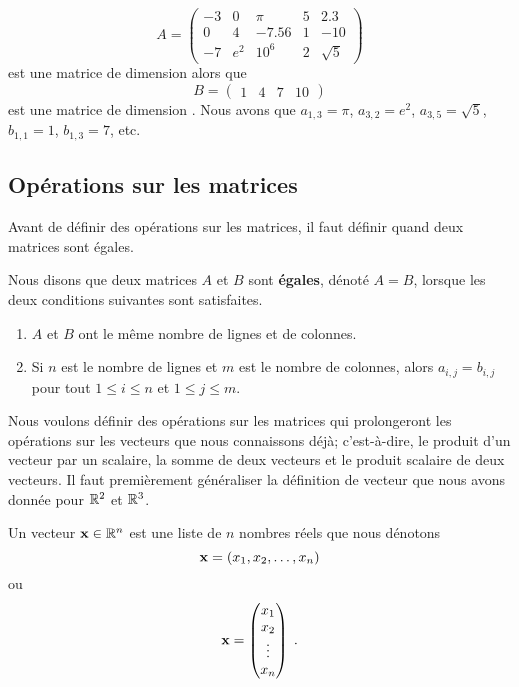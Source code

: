 {\begin{egg}
\[
A =
\begin{pmatrix}
-3 & 0 & \pi & 5 & 2.3 \\
0 & 4 & -7.56 & 1 & -10 \\
-7 & e^2 & 10^6 & 2 & \sqrt{5}
\end{pmatrix}
\]
est une matrice de dimension  alors que
\[
B =
\begin{pmatrix}
1 & 4 & 7 & 10
\end{pmatrix}
\]
est une matrice de dimension .  Nous avons que $a_{1,3} = \pi$,
$a_{3,2} = e^2$, $a_{3,5} = \sqrt{5}$, $b_{1,1} = 1$, $b_{1,3} = 7$, etc.
\end{egg}

\subsection{Opérations sur les matrices}

Avant de définir des opérations sur les matrices, il faut définir
quand deux matrices sont égales.

\begin{focus}{\dfn} 
Nous disons que deux matrices $A$ et $B$ sont {\bfseries égales}, dénoté
$A = B$, lorsque les deux conditions suivantes sont satisfaites.
\begin{enumerate}
\item $A$ et $B$ ont le même nombre de lignes et de colonnes.
\item Si $n$ est le nombre de lignes et $m$ est le nombre de colonnes,
alors $a_{i,j}=b_{i,j}$ pour tout $1\leq i \leq n$ et $1\leq j \leq  m$.
\end{enumerate}
\end{focus}

Nous voulons définir des opérations sur les matrices qui prolongeront les
opérations sur les vecteurs que nous connaissons déjà; c'est-à-dire, le
produit d'un vecteur par un scalaire, la somme de deux vecteurs et le
produit scalaire de deux vecteurs.   Il faut premièrement généraliser
la définition de vecteur que nous avons donnée pour $\mathbb{R}^2$ et
$\mathbb{R}^3$.

\begin{focus}{\dfn}
Un vecteur $\mathbf{x} \in \mathbb{R}^n$ est une liste de $n$ nombres réels que
nous dénotons
\begin{equation}\label{rowVect}
\mathbf{x} = (x_1,x_2, \ldots, x_n)
\end{equation}
ou
\begin{equation}\label{matrVect}
\mathbf{x} = \begin{pmatrix} x_1 \\ x_2 \\ \vdots \\ x_n \end{pmatrix} \; .
\end{equation}
\end{focus}

}
